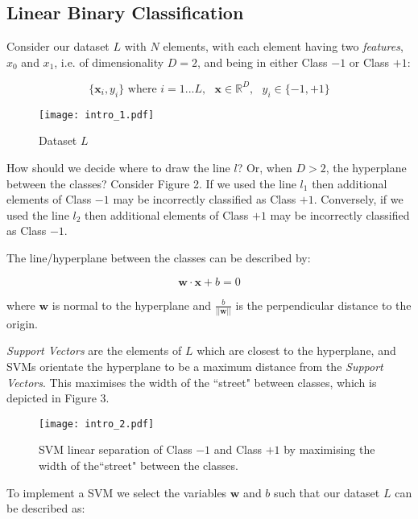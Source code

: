 \documentclass[10pt, a4paper,reqno]{amsart}
\begin{document}
\subsection{Linear Binary Classification}

Consider our dataset $L$ with $N$ elements, with each element having two \emph{features}, $x_0$ and $x_1$, i.e. of dimensionality $D = 2$, and being in either Class $-1$ or Class $+1$:

\begin{equation}
\{\mathbf{x}_i, y_i\}\text{ where }i = 1...L,\text{ }\mathbf{x} \in \mathbb{R}^{D},\text{ }y_i \in \{-1, +1\}
\end{equation}

\begin{figure}[H]
	\centering	
	\texttt{[image: intro\_1.pdf]}
	\caption{Dataset $L$}
\end{figure}

How should we decide where to draw the line $l$? Or, when $D > 2$, the hyperplane between the classes? Consider Figure 2. If we used the line $l_1$ then additional elements of Class $-1$ may be incorrectly classified as Class $+1$. Conversely, if we used the line $l_2$ then additional elements of Class $+1$ may be incorrectly classified as Class $-1$.

The line/hyperplane between the classes can be described by:

\begin{equation}
\mathbf{w}\cdot\mathbf{x} + b = 0
\end{equation}

where $\mathbf{w}$ is normal to the hyperplane and $\frac{b}{||\mathbf{w}||}$ is the perpendicular distance to the origin.

\emph{Support Vectors} are the elements of $L$ which are closest to the hyperplane, and SVMs orientate the hyperplane to be a maximum distance from the \emph{Support Vectors}. This maximises the width of the ``street" between classes, which is depicted in Figure 3.

\begin{figure}
	\centering	
	\texttt{[image: intro\_2.pdf]}
	\caption{SVM linear separation of Class $-1$ and Class $+1$ by maximising the width of the``street" between the classes.}
\end{figure}

To implement a SVM we select the variables $\mathbf{w}$ and $b$ such that our dataset $L$ can be described as:
\end{document}

